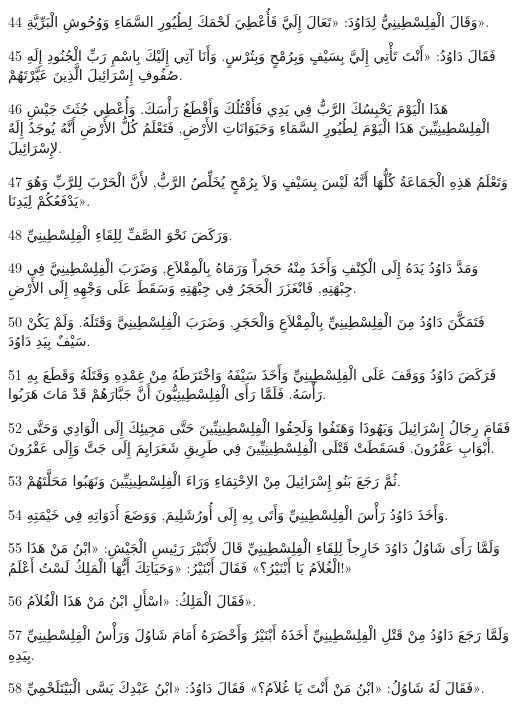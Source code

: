 \par 44 وَقَالَ الْفِلِسْطِينِيُّ لِدَاوُدَ: «تَعَالَ إِلَيَّ فَأُعْطِيَ لَحْمَكَ لِطُيُورِ السَّمَاءِ وَوُحُوشِ الْبَرِّيَّةِ».
\par 45 فَقَالَ دَاوُدُ: «أَنْتَ تَأْتِي إِلَيَّ بِسَيْفٍ وَبِرُمْحٍ وَبِتُرْسٍ. وَأَنَا آتِي إِلَيْكَ بِاسْمِ رَبِّ الْجُنُودِ إِلَهِ صُفُوفِ إِسْرَائِيلَ الَّذِينَ عَيَّرْتَهُمْ.
\par 46 هَذَا الْيَوْمَ يَحْبِسُكَ الرَّبُّ فِي يَدِي فَأَقْتُلُكَ وَأَقْطَعُ رَأْسَكَ. وَأُعْطِي جُثَثَ جَيْشِ الْفِلِسْطِينِيِّينَ هَذَا الْيَوْمَ لِطُيُورِ السَّمَاءِ وَحَيَوَانَاتِ الأَرْضِ, فَتَعْلَمُ كُلُّ الأَرْضِ أَنَّهُ يُوجَدُ إِلَهٌ لإِسْرَائِيلَ.
\par 47 وَتَعْلَمُ هَذِهِ الْجَمَاعَةُ كُلُّهَا أَنَّهُ لَيْسَ بِسَيْفٍ وَلاَ بِرُمْحٍ يُخَلِّصُ الرَّبُّ, لأَنَّ الْحَرْبَ لِلرَّبِّ وَهُوَ يَدْفَعُكُمْ لِيَدِنَا».
\par 48 وَرَكَضَ نَحْوَ الصَّفِّ لِلِقَاءِ الْفِلِسْطِينِيِّ.
\par 49 وَمَدَّ دَاوُدُ يَدَهُ إِلَى الْكِنْفِ وَأَخَذَ مِنْهُ حَجَراً وَرَمَاهُ بِالْمِقْلاَعِ, وَضَرَبَ الْفِلِسْطِينِيَّ فِي جِبْهَتِهِ, فَانْغَزَرَ الْحَجَرُ فِي جِبْهَتِهِ وَسَقَطَ عَلَى وَجْهِهِ إِلَى الأَرْضِ.
\par 50 فَتَمَكَّنَ دَاوُدُ مِنَ الْفِلِسْطِينِيِّ بِالْمِقْلاَعِ وَالْحَجَرِ, وَضَرَبَ الْفِلِسْطِينِيَّ وَقَتَلَهُ. وَلَمْ يَكُنْ سَيْفٌ بِيَدِ دَاوُدَ.
\par 51 فَرَكَضَ دَاوُدُ وَوَقَفَ عَلَى الْفِلِسْطِينِيِّ وَأَخَذَ سَيْفَهُ وَاخْتَرَطَهُ مِنْ غِمْدِهِ وَقَتَلَهُ وَقَطَعَ بِهِ رَأْسَهُ. فَلَمَّا رَأَى الْفِلِسْطِينِيُّونَ أَنَّ جَبَّارَهُمْ قَدْ مَاتَ هَرَبُوا.
\par 52 فَقَامَ رِجَالُ إِسْرَائِيلَ وَيَهُوذَا وَهَتَفُوا وَلَحِقُوا الْفِلِسْطِينِيِّينَ حَتَّى مَجِيئِكَ إِلَى الْوَادِي وَحَتَّى أَبْوَابِ عَقْرُونَ. فَسَقَطَتْ قَتْلَى الْفِلِسْطِينِيِّينَ فِي طَرِيقِ شَعَرَايِمَ إِلَى جَتَّ وَإِلَى عَقْرُونَ.
\par 53 ثُمَّ رَجَعَ بَنُو إِسْرَائِيلَ مِنْ الاِحْتِمَاءِ وَرَاءَ الْفِلِسْطِينِيِّينَ وَنَهَبُوا مَحَلَّتَهُمْ.
\par 54 وَأَخَذَ دَاوُدُ رَأْسَ الْفِلِسْطِينِيِّ وَأَتَى بِهِ إِلَى أُورُشَلِيمَ, وَوَضَعَ أَدَوَاتِهِ فِي خَيْمَتِهِ.
\par 55 وَلَمَّا رَأَى شَاوُلُ دَاوُدَ خَارِجاً لِلِقَاءِ الْفِلِسْطِينِيِّ قَالَ لأَبْنَيْرَ رَئِيسِ الْجَيْشِ: «ابْنُ مَنْ هَذَا الْغُلاَمُ يَا أَبْنَيْرُ؟» فَقَالَ أَبْنَيْرُ: «وَحَيَاتِكَ أَيُّهَا الْمَلِكُ لَسْتُ أَعْلَمُ!»
\par 56 فَقَالَ الْمَلِكُ: «اسْأَلِ ابْنُ مَنْ هَذَا الْغُلاَمُ».
\par 57 وَلَمَّا رَجَعَ دَاوُدُ مِنْ قَتْلِ الْفِلِسْطِينِيِّ أَخَذَهُ أَبْنَيْرُ وَأَحْضَرَهُ أَمَامَ شَاوُلَ وَرَأْسُ الْفِلِسْطِينِيِّ بِيَدِهِ.
\par 58 فَقَالَ لَهُ شَاوُلُ: «ابْنُ مَنْ أَنْتَ يَا غُلاَمُ؟» فَقَالَ دَاوُدُ: «ابْنُ عَبْدِكَ يَسَّى الْبَيْتَلَحْمِيِّ».

